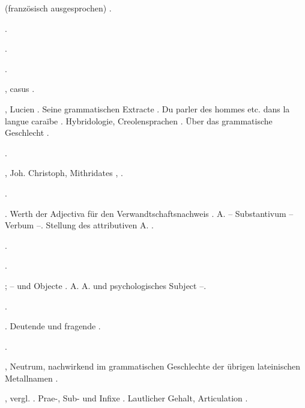 \begin{register}
 (französisch ausgesprochen) \pageref{sp.34}.



 \pageref{sp.102}.


 \pageref{sp.236}.

 \pageref{sp.102}\sed{, \pageref{sp.459}}.

, casus \pageref{sp.102}.

, Lucien \pageref{sp.31}. Seine grammatischen Extracte \pageref{sp.52}. Du parler des hommes etc. dans la langue caraïbe \pageref{sp.248}. Hybridologie, Creolensprachen \pageref{sp.279}. Über das grammatische Geschlecht \pageref{sp.481}.

 \pageref{sp.180}.

, Joh. Christoph, Mithridates \pageref{sp.28}, \pageref{sp.31}.

 \pageref{sp.114}.

 \pageref{sp.101}. Werth der Adjectiva für den Verwandtschaftsnachweis \pageref{sp.152}. A. – Substantivum – Verbum \pageref{sp.382}–\pageref{sp.385}. Stellung des attributiven A. \pageref{sp.401}.


 \pageref{sp.101}.

 \pageref{sp.104}.

 \pageref{sp.101}; – und Objecte \pageref{sp.102}. A. A. und psychologisches Subject \pageref{sp.371}–\pageref{sp.372}.

 \pageref{sp.104}.

 \pageref{sp.101}. Deutende und fragende \pageref{sp.385}.

 \pageref{sp.21}.

, Neutrum, nachwirkend im grammatischen Geschlechte der übrigen lateinischen Metallnamen \pageref{sp.237}.

, vergl. . Prae-, Sub- und Infixe \pageref{sp.349}. Lautlicher Gehalt, Articulation \pageref{sp.436}.



\end{register}

